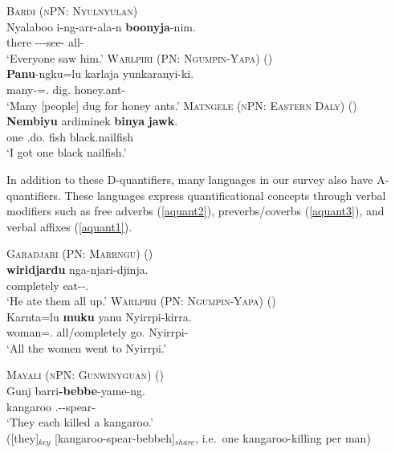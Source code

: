 \documentclass[12pt,egregdoesnotlikesansseriftitles]{scrartcl}
\begin{document}
\begin{exe}
  \ex\label{allerg} \textsc{Bardi (nPN: Nyulnyulan)}\hfill {}\\
  \gll Nyalaboo i-ng-arr-ala-n \textbf{boonyja}-nim.\\
  there \Third-\Pst-\Aug-see-\Rempst{} all-\Erg\\
  \glt `Everyone saw him.'
  \ex \textsc{Warlpiri (PN: Ngumpin-Yapa)} \hfill(\citealt[967]{bowler17})\\
  \gll \textbf{Panu}-ngku=lu karlaja yunkaranyi-ki.\\
  many-\Erg=\Tpl.\Sarg{} dig.\Pst{} honey.ant-\Dat\\
  \glt `Many [people] dug for honey ants.' \label{agrmarking1}
  \ex \textsc{Matngele (nPN: Eastern Daly)} \hfill(\citealt[54]{zandvoort99})\\
  \gll \textbf{Nembiyu} ardiminek \textbf{binya} \textbf{jawk}.\\
  one \First\Min\Sarg.do.\Pst{} fish black.nailfish\\
  \glt `I got one black nailfish.'  \label{discconst}
\end{exe}


In addition to these D-quantifiers, many languages in our survey also have A-quantifiers. These languages express quantificational concepts through verbal modifiers such as free adverbs (\ref{aquant2}), preverbs/coverbs (\ref{aquant3}), and verbal affixes (\ref{aquant1}).
\begin{exe}
  \ex\textsc{Garadjari (PN: Marrngu)} \hfill(\citealt[54]{sands89})\\
  \gll \textbf{wiridjardu}  nga-njari-djinja.\\
  completely  eat-\Cont{}-\Tpl.\Parg\\
  \glt `He ate them all up.' \label{aquant2}
  \ex \textsc{Warlpiri (PN: Ngumpin-Yapa)} \hfill (\citealt[975]{bowler17})\\
  \gll Karnta=lu \textbf{muku} yanu Nyirrpi-kirra.\\
  woman=\Tpl.\Sarg{} all/completely go.\Pst{} Nyirrpi-\All\\
  
  `All the women went to Nyirrpi.'\label{aquant3}

  \ex \textsc{Mayali (nPN: Gunwinyguan)} \hfill(\citealt[221]{evans95})\\
  \gll Gunj barri\textbf{-bebbe}-yame-ng.\\
  kangaroo \Third.\Aug-\Distr-spear-\Pp\\
  \glt `They each killed a kangaroo.'\\
  ([they]$_{key}$ [kangaroo-spear-bebbeh]$_{share}$, i.e.\ one kangaroo-killing per man) \label{aquant1}
\end{exe}
\end{document}
